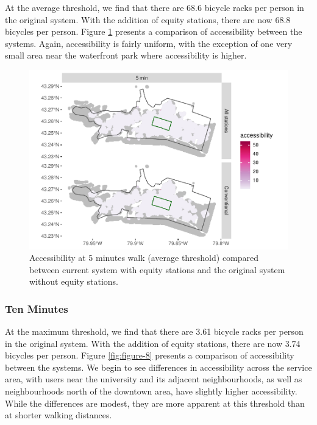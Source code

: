 \documentclass[]{elsarticle} %
\begin{document}
At the average threshold, we find that there are 68.6 bicycle racks per
person in the original system. With the addition of equity stations,
there are now 68.8 bicycles per person. Figure \ref{fig:figure-7}
presents a comparison of accessibility between the systems. Again,
accessibility is fairly uniform, with the exception of one very small
area near the waterfront park where accessibility is higher.

\begin{figure}

{\centering \includegraphics[width=0.65\linewidth]{Bike-share-spatial-equity_files/figure-latex/figure-7-1} 

}

\caption{Accessibility at 5 minutes walk (average threshold) compared between current system with equity stations and the original system without equity stations.}\label{fig:figure-7}
\end{figure}

\hypertarget{ten-minutes}{%
\subsubsection{Ten Minutes}\label{ten-minutes}}

At the maximum threshold, we find that there are 3.61 bicycle racks per
person in the original system. With the addition of equity stations,
there are now 3.74 bicycles per person. Figure \ref{fig:figure-8}
presents a comparison of accessibility between the systems. We begin to
see differences in accessibility across the service area, with users
near the university and its adjacent neighbourhoods, as well as
neighbourhoods north of the downtown area, have slightly higher
accessibility. While the differences are modest, they are more apparent
at this threshold than at shorter walking distances.
\end{document}
